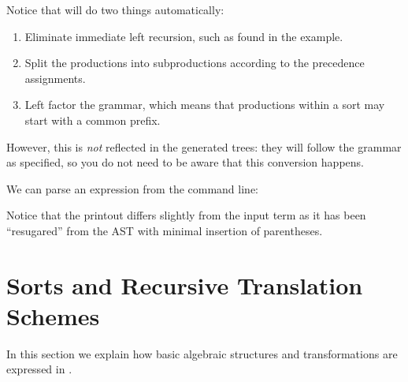 \documentclass[11pt]{article} %
\begin{document}
Notice that \HAX will do two things automatically:
\begin{enumerate}
\item Eliminate immediate left recursion, such as found in the example.
\item Split the productions into subproductions according to the precedence assignments.
\item Left factor the grammar, which means that productions within a sort may start with a common
  prefix.
\end{enumerate}
However, this is \emph{not} reflected in the generated trees: they will follow the grammar as
specified, so you do not need to be aware that this conversion happens.

\begin{commands}
  We can parse an expression from the command line:
  Notice that the printout differs slightly from the input term as it has been ``resugared'' from
  the AST with minimal insertion of parentheses.
\end{commands}


\section{Sorts and Recursive Translation Schemes}
\label{sec:schemes}

In this section we explain how basic algebraic structures and transformations are expressed in \HAX.
\end{document}
